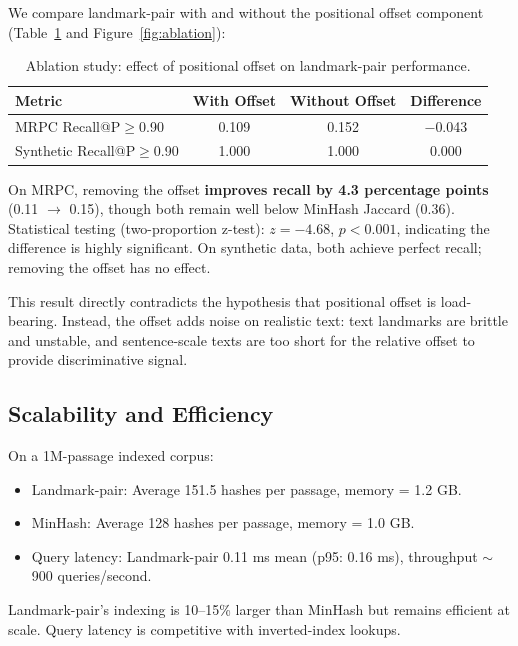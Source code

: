 \documentclass[11pt,letterpaper]{article}
\begin{document}
We compare landmark-pair with and without the positional offset component (Table~\ref{tab:ablation} and Figure~\ref{fig:ablation}):

\begin{table}[!htbp]
  \centering
  \caption{Ablation study: effect of positional offset on landmark-pair performance.}
  \label{tab:ablation}
  \begin{tabular}{lccc}
    \toprule
    Metric & With Offset & Without Offset & Difference \\
    \midrule
    MRPC Recall@P$\geq$0.90 & 0.109 & 0.152 & $-$0.043 \\
    Synthetic Recall@P$\geq$0.90 & 1.000 & 1.000 & 0.000 \\
    \bottomrule
  \end{tabular}
\end{table}

On MRPC, removing the offset \textbf{improves recall by 4.3 percentage points} (0.11 $\rightarrow$ 0.15), though both remain well below MinHash Jaccard (0.36). Statistical testing (two-proportion z-test): $z = -4.68$, $p < 0.001$, indicating the difference is highly significant. On synthetic data, both achieve perfect recall; removing the offset has no effect.

This result directly contradicts the hypothesis that positional offset is load-bearing. Instead, the offset adds noise on realistic text: text landmarks are brittle and unstable, and sentence-scale texts are too short for the relative offset to provide discriminative signal.

\subsection{Scalability and Efficiency}

On a 1M-passage indexed corpus:
\begin{itemize}
  \item Landmark-pair: Average 151.5 hashes per passage, memory = 1.2 GB.
  \item MinHash: Average 128 hashes per passage, memory = 1.0 GB.
  \item Query latency: Landmark-pair 0.11 ms mean (p95: 0.16 ms), throughput $\sim$900 queries/second.
\end{itemize}

Landmark-pair's indexing is 10--15\% larger than MinHash but remains efficient at scale. Query latency is competitive with inverted-index lookups.
\end{document}
